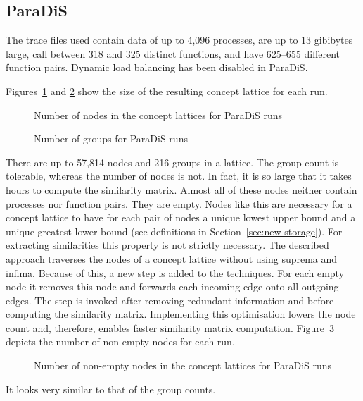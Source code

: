 \documentclass[a4paper, final, diplominf]{zih-template}
\begin{document}
\subsection{ParaDiS}
\label{sec:evaluation-scalability-paradis}
The trace files used contain data of up to 4,096 processes, are up to 13 gibibytes large, call between 318 and 325 distinct functions, and have 625--655 different function pairs. Dynamic load balancing has been disabled in ParaDiS.

Figures~\ref{fig:paradis-node-counts} and \ref{fig:paradis-group-counts} show the size of the resulting concept lattice for each run.
\begin{figure}[p]
	\centering
	
	\caption{Number of nodes in the concept lattices for ParaDiS runs}
	\label{fig:paradis-node-counts}
\end{figure}
\begin{figure}[p]
	\centering
	
	\caption{Number of groups for ParaDiS runs}
	\label{fig:paradis-group-counts}
\end{figure}
There are up to 57,814 nodes and 216 groups in a lattice.
The group count is tolerable, whereas the number of nodes is not.
In fact, it is so large that it takes hours to compute the similarity matrix.
Almost all of these nodes neither contain processes nor function pairs.
They are empty.
Nodes like this are necessary for a concept lattice to have for each pair of nodes a unique lowest upper bound and a unique greatest lower bound (see definitions in Section~\ref{sec:new-storage}).
For extracting similarities this property is not strictly necessary.
The described approach traverses the nodes of a concept lattice without using suprema and infima.
Because of this, a new step is added to the techniques.
For each empty node it removes this node and forwards each incoming edge onto all outgoing edges.
The step is invoked after removing redundant information and before computing the similarity matrix.
Implementing this optimisation lowers the node count and, therefore, enables faster similarity matrix computation.
Figure~\ref{fig:paradis-non-empty-node-counts} depicts the number of non-empty nodes for each run.
\begin{figure}[tbh]
	\centering
	
	\caption{Number of non-empty nodes in the concept lattices for ParaDiS runs}
	\label{fig:paradis-non-empty-node-counts}
\end{figure}
It looks very similar to that of the group counts.
\end{document}
